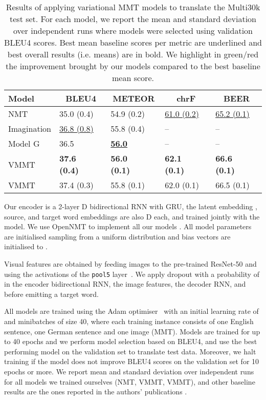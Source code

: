 \documentclass[11pt,a4paper]{article}
\newcommand{\red}[1]{\textcolor{Red}{#1}}
\newcommand{\green}[1]{\textcolor{OliveGreen}{#1}}
\newcommand{\cond}{VMMT\xspace}
\newcommand{\uncond}{VMMT\xspace}
\begin{document}
\begin{table*}[t!]
\centering
\begin{tabular}{lllllllll}
\toprule
{\bf Model} & \multicolumn{2}{c}{\bf BLEU4} & \multicolumn{2}{c}{\bf METEOR} & \multicolumn{2}{c}{\bf chrF} & \multicolumn{2}{c}{\bf BEER} \\
\midrule
NMT  &
	35.0 (0.4) && 54.9 (0.2) && \underline{61.0 (0.2)} && \underline{65.2 (0.1)} \\
Imagination &
	\underline{36.8 (0.8)} &&  55.8 (0.4) && -- && -- \\
Model G &
	36.5 && \underline{{\bf 56.0}} && -- && -- \\
    
\midrule

\uncond  &
	{\bf 37.6 (0.4)} & \green{} &
    {\bf 56.0 (0.1)} & \green{} &
    {\bf 62.1 (0.1)} & \green{} &
    {\bf 66.6 (0.1)} & \green{} \\
\cond  &
	37.4 (0.3) & \green{} &
    55.8 (0.1) & \red{} &
    62.0 (0.1) & \green{} &
    66.5 (0.1) & \green{} \\
\bottomrule
\end{tabular}
\caption{Results of applying variational MMT models to translate the Multi30k test set. For each model, we report the mean and standard deviation over  independent runs where models were selected using validation BLEU4 scores. Best mean baseline scores per metric are underlined and best overall results (i.e. means) are in bold. We highlight in green/red the improvement brought by our models compared to the best baseline mean score.}
\label{tab:main_results}
\end{table*}


Our encoder is a 2-layer D bidirectional RNN with GRU, the latent embedding , source, and target word embeddings are also D each, and trained jointly with the model.
We use OpenNMT to implement all our models \citep{opennmt}.
All model parameters are initialised sampling from a uniform distribution  and bias vectors are initialised to .

Visual features are obtained by feeding images to the pre-trained ResNet-50 and using the activations of the \texttt{pool5} layer~\cite{He2015}.
We apply dropout with a probability of  in the encoder bidirectional RNN, the image features, the decoder RNN, and before emitting a target word.

All models are trained using the Adam optimiser~\cite{KingmaBa2014} with an initial learning rate of  and minibatches of size 40, where each training instance consists of one English sentence, one German sentence and one image (MMT).
Models are trained for up to 40 epochs and we perform model selection based on BLEU4, and use the best performing model on the validation set to translate test data.
Moreover, we halt training if the model does not improve BLEU4 scores on the validation set for 10 epochs or more.
We report mean and standard deviation over  independent runs for all models we trained ourselves (NMT, \uncond, \cond), and other baseline results are the ones reported in the authors' publications \citep{Toyamaetal2016,ElliottKadar2017}.
\end{document}

